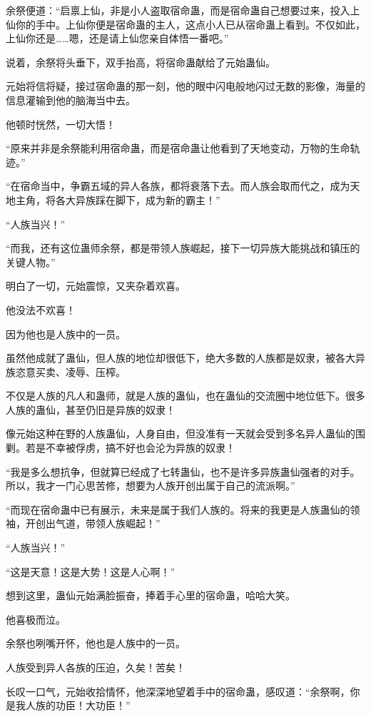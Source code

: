 \begin{this_body}
余祭便道：“启禀上仙，非是小人盗取宿命蛊，而是宿命蛊自己想要过来，投入上仙你的手中。上仙你便是宿命蛊的主人，这点小人已从宿命蛊上看到。不仅如此，上仙你还是……嗯，还是请上仙您亲自体悟一番吧。”

说着，余祭将头垂下，双手抬高，将宿命蛊献给了元始蛊仙。

元始将信将疑，接过宿命蛊的那一刻，他的眼中闪电般地闪过无数的影像，海量的信息灌输到他的脑海当中去。

他顿时恍然，一切大悟！

“原来并非是余祭能利用宿命蛊，而是宿命蛊让他看到了天地变动，万物的生命轨迹。”

“在宿命当中，争霸五域的异人各族，都将衰落下去。而人族会取而代之，成为天地主角，将各大异族踩在脚下，成为新的霸主！”

“人族当兴！”

“而我，还有这位蛊师余祭，都是带领人族崛起，接下一切异族大能挑战和镇压的关键人物。”

明白了一切，元始震惊，又夹杂着欢喜。

他没法不欢喜！

因为他也是人族中的一员。

虽然他成就了蛊仙，但人族的地位却很低下，绝大多数的人族都是奴隶，被各大异族恣意买卖、凌辱、压榨。

不仅是人族的凡人和蛊师，就是人族的蛊仙，也在蛊仙的交流圈中地位低下。很多人族的蛊仙，甚至仍旧是异族的奴隶！

像元始这种在野的人族蛊仙，人身自由，但没准有一天就会受到多名异人蛊仙的围剿。若是不幸被俘虏，搞不好也会沦为异族的奴隶！

“我是多么想抗争，但就算已经成了七转蛊仙，也不是许多异族蛊仙强者的对手。所以，我才一门心思苦修，想要为人族开创出属于自己的流派啊。”

“而现在宿命蛊中已有展示，未来是属于我们人族的。将来的我更是人族蛊仙的领袖，开创出气道，带领人族崛起！”

“人族当兴！”

“这是天意！这是大势！这是人心啊！”

想到这里，蛊仙元始满脸振奋，捧着手心里的宿命蛊，哈哈大笑。

他喜极而泣。

余祭也咧嘴开怀，他也是人族中的一员。

人族受到异人各族的压迫，久矣！苦矣！

长叹一口气，元始收拾情怀，他深深地望着手中的宿命蛊，感叹道：“余祭啊，你是我人族的功臣！大功臣！”


\end{this_body}
